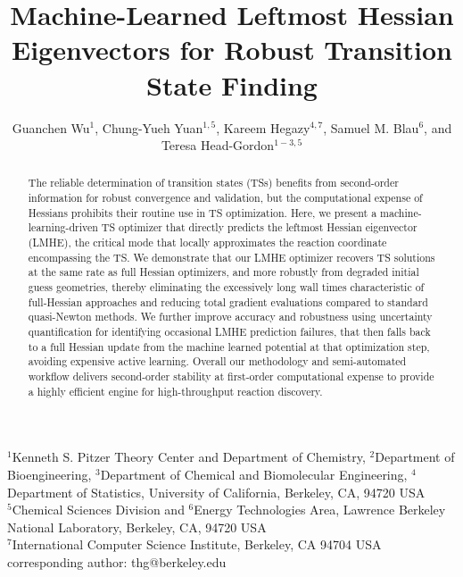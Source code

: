 \documentclass[12pt]{article}
\begin{document}
\title{\textbf{Machine-Learned Leftmost Hessian Eigenvectors for Robust Transition State Finding}}

\author{Guanchen Wu$^{1}$, Chung-Yueh Yuan$^{1,5}$, Kareem Hegazy$^{4,7}$, Samuel M. Blau$^{6}$, and Teresa Head-Gordon$^{1-3,5}$}
\date{}
\maketitle

\begin{center}
\vspace{-24pt}
$^1$Kenneth S. Pitzer Theory Center and Department of Chemistry, $^2$Department of Bioengineering, $^3$Department of Chemical and Biomolecular Engineering, $^4$Department of Statistics, University of California, Berkeley, CA, 94720 USA\\
$^5$Chemical Sciences Division and $^6$Energy Technologies Area, Lawrence Berkeley National Laboratory, Berkeley, CA, 94720 USA\\
$^7$International Computer Science Institute, Berkeley, CA 94704 USA\\

corresponding author: thg@berkeley.edu
\end{center}

\begin{abstract}
\noindent
The reliable determination of transition states (TSs) benefits from second-order information  for robust convergence and validation, but the computational expense of Hessians prohibits their routine use in TS optimization. Here, we present a machine-learning-driven TS optimizer that directly predicts the leftmost Hessian eigenvector (LMHE), the critical mode that locally approximates the reaction coordinate encompassing the TS. We demonstrate that our LMHE optimizer recovers TS solutions at the same rate as full Hessian optimizers, and more robustly from degraded initial guess geometries, thereby eliminating the excessively long wall times characteristic of full-Hessian approaches and reducing total gradient evaluations compared to standard quasi-Newton methods. We further improve accuracy and robustness using uncertainty quantification for identifying occasional LMHE prediction failures, that then falls back to a full Hessian update from the machine learned potential at that optimization step, avoiding expensive active learning. Overall our methodology and semi-automated workflow delivers second-order stability at first-order computational expense to provide a highly efficient engine for high-throughput reaction discovery. 

\end{abstract}
\end{document}
